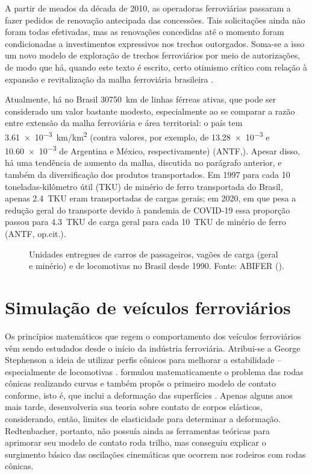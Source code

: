 A partir de meados da década de 2010, as operadoras ferroviárias passaram a fazer pedidos de renovação antecipada das
concessões. Tais solicitações ainda não foram todas efetivadas, mas as renovações concedidas até o momento foram condicionadas
a investimentos expressivos nos trechos outorgados. Soma-se a isso um novo modelo de exploração de trechos ferroviários 
por meio de autorizações, de modo que há, quando este texto é escrito, certo otimismo crítico com relação à expansão e revitalização
da malha ferroviária brasileira \cite{rocha_modelo_2022}. 

Atualmente, há no Brasil \SI{30750}{km} de linhas férreas ativas, que pode ser considerado um valor bastante modesto, especialmente ao
se comparar a razão entre extensão da malha ferroviária e área territorial: o país tem \SI{3,61e-3}{\km / \km\squared } (contra valores,
por exemplo, de \num{13,28e-3} e
\num{10,60e-3} de Argentina e México, respectivamente) (ANTF,\citeyear{associacao_nacional_dos_transpotadores_ferroviarios_informacoes_2022}).
Apesar disso, há uma tendência de aumento da malha, discutida no parágrafo anterior, e também da diversificação dos produtos transportados.
Em 1997 para cada 10 toneladas-kilômetro útil (TKU) de minério de ferro transportada do Brasil, apenas \SI{2,4}{TKU} eram transportadas de 
cargas gerais; em 2020, em que pesa a redução geral do transporte devido à pandemia de COVID-19 essa proporção passou para \SI{4,3}{TKU} de
carga geral para cada \SI{10}{TKU} de minério de ferro (ANTF, op.cit.).

\begin{figure}
    \centering
    
    \caption{Unidades entregues de carros de passageiros, vagões de carga (geral e minério) e de locomotivas no Brasil desde 1990. Fonte: ABIFER (\citeyear{associacao_brasileira_da_industria_ferroviaria_dados_2022}).}
    \label{fig: unidades abifer}
\end{figure}

\section{Simulação de veículos ferroviários}
Os princípios matemáticos que regem o comportamento dos veículos ferroviários vêm sendo estudados desde o
início da indústria ferroviária. Atribui-se a George Stephenson a ideia de utilizar perfis cônicos para melhorar
a estabilidade -- especialmente de locomotivas \cite{wickens_dynamics_1998, knothe_rail_2017}.  
formulou matematicamente o problema das rodas cônicas realizando curvas e também propôs o primeiro modelo de contato conforme, isto é,
que inclui a deformação das superfícies \cite{knothe_history_2008}. Apenas alguns anos mais tarde,  desenvolveria
sua teoria sobre contato de corpos elásticos, considerando, então, limites de elasticidade para determinar a deformação. Redtenbacher, portanto,
não possuía ainda as ferramentas teóricas para aprimorar seu modelo de contato roda trilho, mas conseguiu explicar o surgimento
básico das oscilações cinemáticas que ocorrem nos rodeiros com rodas cônicas.

